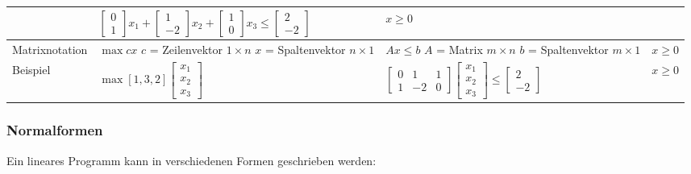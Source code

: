 \begin{tabularx}{\textwidth}{|X|p{4.5cm}|p{5.5cm}|p{2cm}|}
        & $\begin{bmatrix}
            0\\1
          \end{bmatrix} x_1 + 
          \begin{bmatrix}
            1\\-2
          \end{bmatrix} x_2 + 
          \begin{bmatrix}
            1\\0
          \end{bmatrix} x_3
          \leq \begin{bmatrix}
            2 \\ -2
          \end{bmatrix}$
        &  $x \geq 0$
        \\
      \hline
      Matrixnotation
        & $\max c x$ \newline
        $c$ = Zeilenvektor $1 \times n$\newline
        $x$ = Spaltenvektor $n \times 1$
        & $A x \leq b$ \newline
        $A$ = Matrix $m \times n$\newline
        $b$ = Spaltenvektor $m \times 1$
        & $x \geq 0$
        \\
      Beispiel
        & $\max [1, 3, 2]
          \begin{bmatrix}
            x_1\\x_2\\x_3
          \end{bmatrix}$
        & $\begin{bmatrix}
            0& 1 & 1\\
            1& -2 & 0
          \end{bmatrix}
          \begin{bmatrix}
            x_1\\x_2\\x_3
          \end{bmatrix}
          \leq \begin{bmatrix}
            2 \\ -2
          \end{bmatrix}$
        &  $x \geq 0$
        \\
      \hline
    \end{tabularx}


  \subsubsection{Normalformen}
    Ein lineares Programm kann in verschiedenen Formen geschrieben werden:
    
